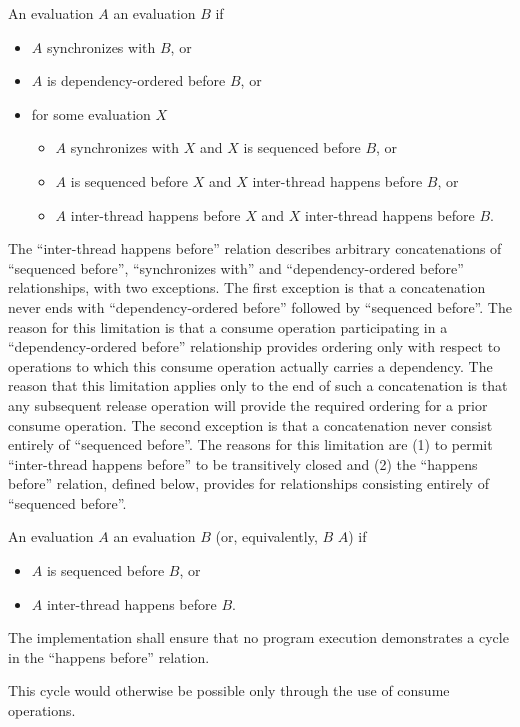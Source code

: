 \pnum
An evaluation $A$  an evaluation $B$
if
\begin{itemize}
\item
  $A$ synchronizes with $B$, or
\item
  $A$ is dependency-ordered before $B$, or
\item
  for some evaluation $X$
  \begin{itemize}
  \item
    $A$ synchronizes with $X$ and $X$
    is sequenced before $B$, or
  \item
    $A$ is sequenced before $X$ and $X$
    inter-thread happens before $B$, or
  \item
    $A$ inter-thread happens before $X$ and $X$
    inter-thread happens before $B$.
  \end{itemize}
\end{itemize}
\begin{note}
The ``inter-thread happens before'' relation describes arbitrary
concatenations of ``sequenced before'', ``synchronizes with'' and
``dependency-ordered before'' relationships, with two exceptions. The first
exception is that a concatenation never ends with
``dependency-ordered before'' followed by ``sequenced before''. The reason for
this limitation is that a consume operation participating in a
``dependency-ordered before'' relationship provides ordering only with respect
to operations to which this consume operation actually carries a dependency. The
reason that this limitation applies only to the end of such a concatenation is
that any subsequent release operation will provide the required ordering for a
prior consume operation. The second exception is that a concatenation never
consist entirely of ``sequenced before''. The reasons for this
limitation are (1) to permit ``inter-thread happens before'' to be transitively
closed and (2) the ``happens before'' relation, defined below, provides for
relationships consisting entirely of ``sequenced before''.
\end{note}

\pnum
An evaluation $A$  an evaluation $B$
(or, equivalently, $B$  $A$) if
\begin{itemize}
\item $A$ is sequenced before $B$, or
\item $A$ inter-thread happens before $B$.
\end{itemize}
The implementation shall ensure that no program execution demonstrates a cycle
in the ``happens before'' relation.
\begin{note}
This cycle would otherwise be
possible only through the use of consume operations.
\end{note}

